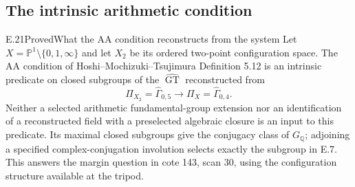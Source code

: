 \subsection{The intrinsic arithmetic condition}
\begin{result}{E.21}{Proved}{What the AA condition reconstructs from the system}
Let $X=\mathbb P^1\setminus\{0,1,\infty\}$ and let $X_2$
be its ordered two-point configuration space.  The AA
condition of Hoshi--Mochizuki--Tsujimura Definition 5.12 is
an intrinsic predicate on closed subgroups of the
$\widehat{\operatorname{GT}}$ reconstructed from
\[
 \Pi_{X_2}=\widehat\Gamma_{0,5}
       \longrightarrow\Pi_X=\widehat\Gamma_{0,4}.             \tag{E.48}
\]
Neither a selected arithmetic fundamental-group extension
nor an identification of a reconstructed field with a
preselected algebraic closure is an input to this predicate.
Its maximal closed subgroups give the conjugacy class of
$G_{\mathbb Q}$; adjoining a specified complex-conjugation
involution selects exactly the subgroup in E.7.
This answers the margin question in cote 143, scan 30,
using the configuration structure available at the tripod.
\end{result}
